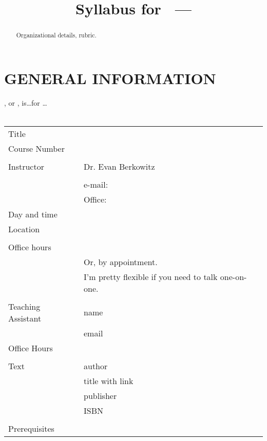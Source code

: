 
\providecommand{\repositoryInformationSetup}{} %
\repositoryInformationSetup




\title{Syllabus for \class\ --- \classTitle}
\contact
\date{\semester}

\begin{abstract}
	Organizational details, rubric.
\end{abstract}

\maketitle

\section*{GENERAL INFORMATION}

\classTitle, or \class, is\ldots for \ldots
\\
\\
\begin{tabular}{p{}p{}}%
	Title			&	\classTitle
	\\
	Course Number	&	\class
	\\
	\\
	Instructor		&	Dr. Evan Berkowitz	\\
	\\
					&	e-mail: \href{mailto:}{} \\
					&	Office: 
	\\
	Day and time	&	\\	
	Location		&	\\
	\\
	Office hours	&	\\
					&	Or, by appointment. \\
					&	I'm pretty flexible if you need to talk one-on-one. \\
	\\

	Teaching Assistant
					&	name \\
					&	email \\
	Office Hours	&	\\
	\\

	Text			&	author \\
					&	title with link \\
					&	publisher \\
					&	ISBN \\
	\\
	Prerequisites	&	
\end{tabular}


